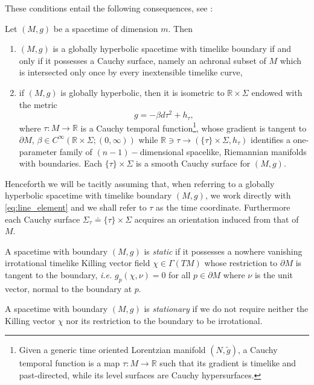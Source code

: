 These conditions entail the following consequences, see \cite[Th. 1.1 \& 3.14]{Ake-Flores-Sanchez-18}:

\begin{theorem}\label{Thm: Ake-Flores-Sanchez}
	Let $(M,g)$ be a spacetime of dimension $m$. Then 
	\begin{enumerate}
		\item $(M,g)$ is a globally hyperbolic spacetime with timelike boundary if and only if it possesses a Cauchy surface, namely an achronal subset of $M$ which is intersected only once by every inextensible timelike curve,
		\item if $(M,g)$ is globally hyperbolic, then it is isometric to $\mathbb{R}\times\Sigma$ endowed with the metric
		\begin{equation}\label{eq:line_element}
		g=-\beta d\tau^2+h_\tau,
		\end{equation}
		where $\tau:M\to\mathbb{R}$ is a Cauchy temporal function\footnote{Given a generic time oriented Lorentzian manifold $(N,\tilde{g})$, a Cauchy temporal function is a map $\tau:M\to\mathbb{R}$ such that its gradient is timelike and past-directed, while its level surfaces are Cauchy hypersurfaces.}, whose gradient is tangent to $\partial M$, $\beta\in C^\infty(\mathbb{R}\times\Sigma;(0,\infty))$ while $\mathbb{R}\ni\tau\to (\{\tau\}\times\Sigma,h_\tau)$ identifies a one-parameter family of $(n-1)-$dimensional spacelike, Riemannian manifolds with boundaries. Each $\{\tau\}\times\Sigma$ is a smooth Cauchy surface for $(M,g)$.
	\end{enumerate}
\end{theorem}


Henceforth we will be tacitly assuming that, when referring to a globally hyperbolic spacetime with timelike boundary $(M,g)$, we work directly with \eqref{eq:line_element} and we shall refer to $\tau$ as the time coordinate. Furthermore each Cauchy surface $\Sigma_\tau\doteq\{\tau\}\times\Sigma$ acquires an orientation induced from that of $M$.

\begin{Definition}
	A spacetime with boundary $(M,g)$ is {\em static} if it possesses a nowhere vanishing irrotational timelike Killing vector field $\chi\in\Gamma(TM)$ whose restriction to $\partial M$ is tangent to the boundary, {\it i.e.} $g_p(\chi,\nu)=0$ for all $p\in\partial M$ where $\nu$ is the unit vector, normal to the boundary at $p$.\\
\end{Definition}
\vspace{-0.8cm}
\begin{remark}
	A spacetime with boundary $(M,g)$ is {\em stationary} if we do not require neither the Killing vector $\chi$ nor its restriction to the boundary to be irrotational.
\end{remark}


